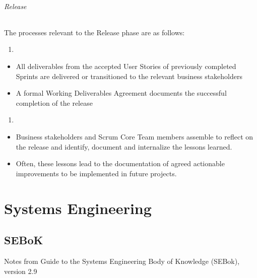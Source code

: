 \documentclass[letterpaper,10pt,english]{jupyterBook}
\begin{document}
\paragraph{Release}
\label{\detokenize{APM/sbok:release}}
\sphinxAtStartPar
The processes relevant to the Release phase are as follows:
\begin{enumerate}
%
\item {} 
\sphinxAtStartPar
{}

\end{enumerate}
\begin{itemize}
\item {} 
\sphinxAtStartPar
All deliverables from the accepted User Stories of previously completed Sprints are delivered or transitioned to the relevant business stakeholders

\item {} 
\sphinxAtStartPar
A formal Working Deliverables Agreement documents the successful completion of the release

\end{itemize}
\begin{enumerate}
%
\setcounter{enumi}{1}
\item {} 
\sphinxAtStartPar
{}

\end{enumerate}
\begin{itemize}
\item {} 
\sphinxAtStartPar
Business stakeholders and Scrum Core Team members assemble to reflect on the release and identify, document and internalize the lessons learned.

\item {} 
\sphinxAtStartPar
Often, these lessons lead to the documentation of agreed actionable improvements to be implemented in future projects.

\end{itemize}

\sphinxstepscope


\part{Systems Engineering}

\sphinxstepscope


\chapter{SEBoK}
\label{\detokenize{SE/sebok:sebok}}\label{\detokenize{SE/sebok::doc}}
\sphinxAtStartPar
Notes from Guide to the Systems Engineering Body of Knowledge (SEBok), version 2.9
\end{document}
